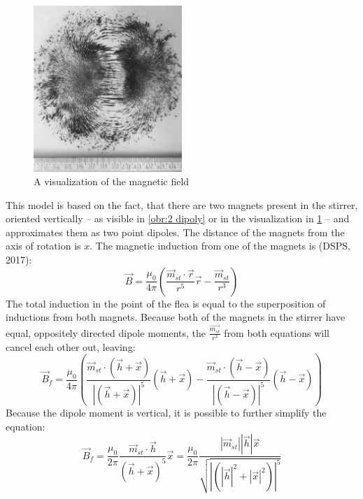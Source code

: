 \documentclass[10pt,a4paper]{article}
\begin{document}
\begin{figure}[H]
  \centering
  \includegraphics[width=0.5\textwidth]{Fig2b.jpg}
  \caption{A visualization of the magnetic field}
  \label{obr:piliny}
\end{figure}
This model is based on the fact, that there are two magnets present in the stirrer, oriented vertically – as visible in \ref{obr:2 dipoly} or in the visualization in \ref{obr:piliny} – and approximates them as two point dipoles. The distance of the magnets from the axis of rotation is $x$. The magnetic induction from one of the magnets is (DSPS, 2017):
\begin{equation}
\vec{B} = \frac{\mu_{0}}{4 \pi} \left(\frac{\vec{m}_{st} \cdot \vec{r}}{r^5}\vec{r} - \frac{\vec{m}_{st}}{r^3}\right)
\label{indukce2dipoly}
\end{equation}
The total induction in the point of the flea is equal to the superposition of inductions from both magnets. Because both of the magnets in the stirrer have equal, oppositely directed dipole moments, the $\frac{\vec{m_{st}}}{r^3}$ from both equations will cancel each other out, leaving:
\begin{equation}
\vec{B}_{f} = \frac{\mu_{0}}{4 \pi} \left( \frac{\vec{m}_{st} \cdot \left( \vec{h} + \vec{x} \right) }{|\left(\vec{h}+\vec{x}\right)|^5}  \left( \vec{h} + \vec{x} \right) - \frac{\vec{m}_{st} \cdot \left( \vec{h} - \vec{x} \right) }{|\left(\vec{h}-\vec{x}\right)|^5}  \left( \vec{h} - \vec{x} \right)\right)
\label{indukce2dipoly:blecha}
\end{equation}
Because the dipole moment is vertical, it is possible to further simplify the equation:
\begin{equation}
\vec{B}_{f} = \frac{\mu_{0}}{2 \pi} \frac{\vec{m}_{st} \cdot \vec{h}}{\left(\vec{h} +\vec{x}\right)^5} \vec{x} =  \frac{\mu_{0}}{2 \pi}  \frac{|\vec{m}_{st}||\vec{h}|  \vec{x}}{\sqrt{|\left(|\vec{h}|^2+|\vec{x}|^2\right)|^5}}
\label{indukce2dipoly:blecha2}
\end{equation}
\end{document}
